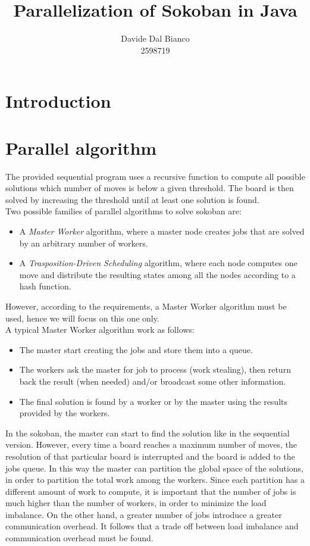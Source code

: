 \documentclass{article}
\title{Parallelization of Sokoban in Java}
\author{Davide Dal Bianco \\ 2598719}
\begin{document}
\maketitle

\section{Introduction}

\section{Parallel algorithm}
The provided sequential program uses a recursive function to compute all possible solutions which number of moves is below a given threshold. The board is then solved by increasing the threshold until at least one solution is found. \\
Two possible families of parallel algorithms to solve sokoban are:
\begin{itemize}
    \item A \textit{Master Worker} algorithm, where a master node creates jobs that are solved by an arbitrary number of workers.
    \item A \textit{Trasposition-Driven Scheduling} algorithm, where each node computes one move and distribute the resulting states among all the nodes according to a hash function.
\end{itemize}
However, according to the requirements, a Master Worker algorithm must be used, hence we will focus on this one only. \\
A typical Master Worker algorithm work as follows:
\begin{itemize}
    \item The master start creating the jobs and store them into a queue.
    \item The workers ask the master for job to process (work stealing), then return back the result (when needed) and/or broadcast some other information.
    \item The final solution is found by a worker or by the master using the results provided by the workers.
\end{itemize}
In the sokoban, the master can start to find the solution like in the sequential version. However, every time a board reaches a maximum number of moves, the resolution of that particular board is interrupted and the board is added to the jobs queue. In this way the master can partition the global space of the solutions, in order to partition the total work among the workers. Since each partition has a different amount of work to compute, it is important that the number of jobs is much higher than the number of workers, in order to minimize the load imbalance. On the other hand, a greater number of jobs introduce a greater communication overhead. It follows that a trade off between load imbalance and communication overhead must be found. \\
\end{document}
